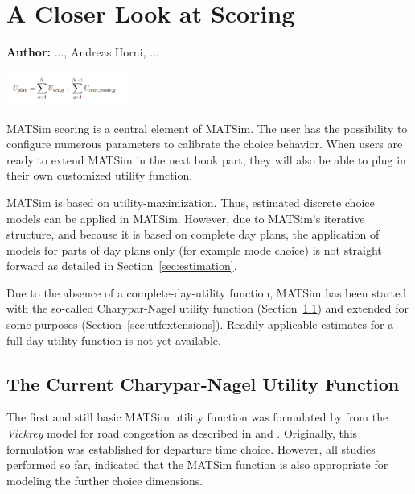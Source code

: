 \chapter{A Closer Look at Scoring}
\label{ch:scoring}

\hfill \textbf{Author:} ..., Andreas Horni, ...

\begin{center} \includegraphics[width=0.3\textwidth, angle=0]{using/figures/utf.png} \end{center}

MATSim scoring is a central element of MATSim. The user has the possibility to configure numerous parameters to calibrate the choice behavior.    When users are ready to extend MATSim in the next book part, they will also be able to plug in their own customized utility function.

MATSim is based on utility-maximization. Thus, estimated discrete choice models can be applied in MATSim. However, due to MATSim's iterative structure, and because it is based on complete day plans, the application of models for parts of day plans only (for example mode choice) is not straight forward as detailed in Section~\ref{sec:estimation}.

Due to the absence of a complete-day-utility function, MATSim has been started with the so-called Charypar-Nagel utility function (Section~\ref{sec:charyparnagel}) and extended for some purposes (Section~\ref{sec:utfextensions}). Readily applicable estimates for a full-day utility function is not yet available. 

\section{The Current Charypar-Nagel Utility Function}
\label{sec:charyparnagel}
The first and still basic MATSim utility function was formulated by \citet[][]{CharyparNagel_Transportation_2005} from the \emph{Vickrey} model for road congestion as described in \citet[][]{Vickrey_TAER_1969} and \citet[][]{ArnottEtAl_TAER_1993}. Originally, this formulation was established for departure time choice. However, all studies performed so far, indicated that the MATSim function is also appropriate for modeling the further choice dimensions.

